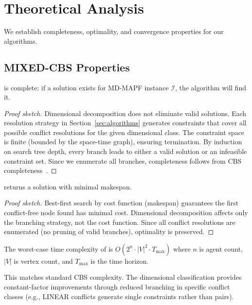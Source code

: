 \section{Theoretical Analysis}
\label{sec:theory}

We establish completeness, optimality, and convergence properties for our algorithms.

\subsection{MIXED-CBS Properties}

\begin{theorem}[Completeness]
\mixedcbs{} is complete: if a solution exists for MD-MAPF instance $\mathcal{I}$, the algorithm will find it.
\end{theorem}

\begin{proof}[Proof sketch]
Dimensional decomposition does not eliminate valid solutions. Each resolution strategy in Section~\ref{sec:algorithms} generates constraints that cover all possible conflict resolutions for the given dimensional class. The constraint space is finite (bounded by the space-time graph), ensuring termination. By induction on search tree depth, every branch leads to either a valid solution or an infeasible constraint set. Since we enumerate all branches, completeness follows from CBS completeness~\cite{sharon2015cbs}.
\end{proof}

\begin{theorem}[Optimality]
\mixedcbs{} returns a solution with minimal makespan.
\end{theorem}

\begin{proof}[Proof sketch]
Best-first search by cost function (makespan) guarantees the first conflict-free node found has minimal cost. Dimensional decomposition affects only the branching strategy, not the cost function. Since all conflict resolutions are enumerated (no pruning of valid branches), optimality is preserved.
\end{proof}

\begin{theorem}[Complexity]
The worst-case time complexity of \mixedcbs{} is $O(2^n \cdot |V|^2 \cdot T_{\max})$ where $n$ is agent count, $|V|$ is vertex count, and $T_{\max}$ is the time horizon.
\end{theorem}

This matches standard CBS complexity. The dimensional classification provides constant-factor improvements through reduced branching in specific conflict classes (e.g., LINEAR conflicts generate single constraints rather than pairs).

